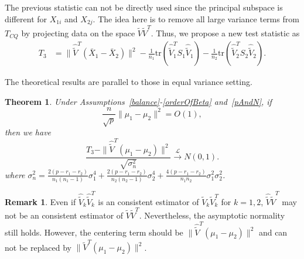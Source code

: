 \documentclass[review]{elsarticle}
\theoremstyle{plain}
\newtheorem{theorem}{\quad\quad Theorem}
\theoremstyle{definition}
\newtheorem{remark}{\quad\quad Remark}
\theoremstyle{remark}
\begin{document}
The previous statistic can not be directly used
since the principal subspace is different for $X_{1i}$ and $X_{2j}$. The idea here is to remove all large variance terms from $T_{CQ}$ by projecting data on the space $\tilde{V}\tilde{V}^T$. Thus, we propose a new test statistic as
\begin{equation*}
\begin{aligned}
    T_3&=\|\hat{\tilde{V}}^T(\bar{X}_1-\bar{X}_2)\|^2-\frac{1}{n_1}\mathrm{tr}(\hat{\tilde{V}}_1^T S_1\hat{\tilde{V}}_1)-\frac{1}{n_2}\mathrm{tr}(\hat{\tilde{V}}_2^T S_2\hat{\tilde{V}}_2).
\end{aligned}
\end{equation*}


The theoretical results are parallel to those in equal variance setting.


\begin{theorem}\label{myXiaopanpan}
    Under Assumptions~\ref{balance}-\ref{orderOfBeta} and~\ref{pAndN},
     if 
    $$\frac{n}{\sqrt{p}}\|\mu_1-\mu_2\|^2=O(1),$$
     then we have
\begin{equation*}
    \frac{T_3-\|\hat{\tilde{V}}^T(\mu_1-\mu_2)\|^2}{\sqrt{\sigma_n^2}}\xrightarrow{\mathcal{L}} N(0,1).
\end{equation*}
where
$\sigma_n^2=\frac{2(p-r_1-r_2)}{n_1(n_1-1)}\sigma_1^4+\frac{2(p-r_1-r_2)}{n_2(n_2-1)}\sigma_2^4+\frac{4(p-r_1-r_2)}{n_1n_2}\sigma_1^2\sigma_2^2$.
\end{theorem}
\begin{remark}
    Even if $\hat{\tilde{V}}_k\hat{\tilde{V}}_k^T$ is an consistent estimator of $\tilde{V}_k\tilde{V}_k^T$ for $k=1,2$, $\hat{\tilde{V}}\hat{\tilde{V}}^T$ may not be an consistent estimator of $\tilde{V}\tilde{V}^T$.
    Nevertheless, the asymptotic normality still holds.
    However, the centering term should be $\|\hat{\tilde{V}}^T(\mu_1-\mu_2)\|^2$ and can not be replaced by $\|\tilde{V}^T(\mu_1-\mu_2)\|^2$.
\end{remark}
\end{document}
